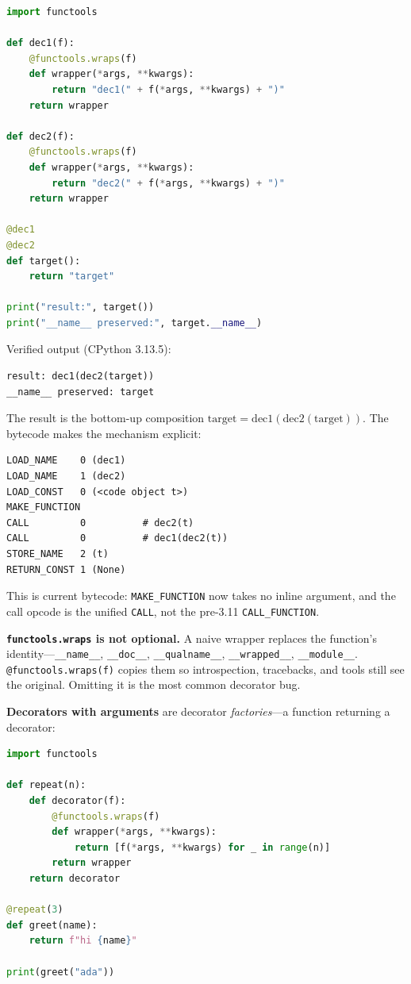 \begin{lstlisting}[language=Python, caption={Stacked decorators compose bottom-up; functools.wraps preserves identity.}]
import functools

def dec1(f):
    @functools.wraps(f)
    def wrapper(*args, **kwargs):
        return "dec1(" + f(*args, **kwargs) + ")"
    return wrapper

def dec2(f):
    @functools.wraps(f)
    def wrapper(*args, **kwargs):
        return "dec2(" + f(*args, **kwargs) + ")"
    return wrapper

@dec1
@dec2
def target():
    return "target"

print("result:", target())
print("__name__ preserved:", target.__name__)
\end{lstlisting}

Verified output (CPython 3.13.5):

\begin{lstlisting}[caption={Output}]
result: dec1(dec2(target))
__name__ preserved: target
\end{lstlisting}

The result is the bottom-up composition $\text{target} = \text{dec1}(\text{dec2}(\text{target}))$.
The bytecode makes the mechanism explicit:

\begin{lstlisting}[caption={dis of stacked decorators on CPython 3.13.5}]
LOAD_NAME    0 (dec1)
LOAD_NAME    1 (dec2)
LOAD_CONST   0 (<code object t>)
MAKE_FUNCTION
CALL         0          # dec2(t)
CALL         0          # dec1(dec2(t))
STORE_NAME   2 (t)
RETURN_CONST 1 (None)
\end{lstlisting}

This is current bytecode: \texttt{MAKE\_FUNCTION} now takes no inline argument, and the call
opcode is the unified \texttt{CALL}, not the pre-3.11 \texttt{CALL\_FUNCTION}.

\textbf{\texttt{functools.wraps} is not optional.} A naive wrapper replaces the function's
identity---\texttt{\_\_name\_\_}, \texttt{\_\_doc\_\_}, \texttt{\_\_qualname\_\_},
\texttt{\_\_wrapped\_\_}, \texttt{\_\_module\_\_}. \texttt{@functools.wraps(f)} copies them so
introspection, tracebacks, and tools still see the original. Omitting it is the most common
decorator bug.

\textbf{Decorators with arguments} are decorator \emph{factories}---a function returning a
decorator:

\begin{lstlisting}[language=Python, caption={A parameterized decorator is a function that returns a decorator.}]
import functools

def repeat(n):
    def decorator(f):
        @functools.wraps(f)
        def wrapper(*args, **kwargs):
            return [f(*args, **kwargs) for _ in range(n)]
        return wrapper
    return decorator

@repeat(3)
def greet(name):
    return f"hi {name}"

print(greet("ada"))
\end{lstlisting}

